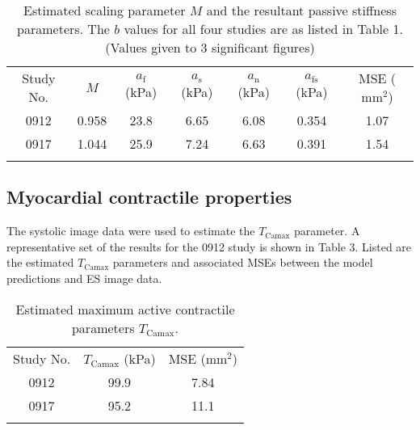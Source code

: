 \documentclass{llncs}
\begin{document}
\begin{table}[H]
	\caption{Estimated scaling parameter $M$ and the resultant passive stiffness parameters. The $b$ values for all four studies are as listed in Table 1. (Values given to 3 significant figures)}
	\begin{center}
		\renewcommand{\arraystretch}{1.0}
		\setlength\tabcolsep{4pt}
		\begin{tabular}{c|c|cccc|c}
		\hline\noalign{\smallskip}
		Study No. & $M$ &$a_{\mathrm{f}}$ (kPa) & $a_{\mathrm{s}}$ (kPa) & $a_{\mathrm{n}}$ (kPa) & $a_{\mathrm{fs}}$ (kPa)& MSE ($\mathrm{mm}^{2}$)\\
		\noalign{\smallskip}
		\hline
		\noalign{\smallskip}
		0912& 0.958 &23.8&6.65&6.08&0.354&1.07\\
		0917& 1.044 &25.9&7.24&6.63&0.391&1.54\\
		\noalign{\smallskip}
		\hline
		\end{tabular}
	\end{center}
\end{table}

\subsection{Myocardial contractile properties}
The systolic image data were used to estimate the $T_{\mathrm{Camax}}$ parameter. A representative set of the results for the 0912 study is shown in Table 3. Listed are the estimated $T_{\mathrm{Camax}}$ parameters and associated MSEs between the model predictions and ES image data. 

\begin{table}
	\caption{Estimated maximum active contractile parameters $T_{\mathrm{Camax}}$.}
	\renewcommand{\arraystretch}{1.2}
	\setlength{\tabcolsep}{20pt}
	\begin{center}
		\begin{tabular}{ccc}
		\hline
		\noalign{\smallskip}
		Study No. & $T_{\mathrm{Camax}}$ (kPa) & MSE ($\mathrm{mm}^{2}$)\\
		\noalign{\smallskip}
		\hline
		\noalign{\smallskip}
		0912 & 99.9 & 7.84 \\  %
		0917 & 95.2&11.1\\
		\noalign{\smallskip}
		\hline
		\end{tabular}
	\end{center}
\end{table} 
\end{document}

